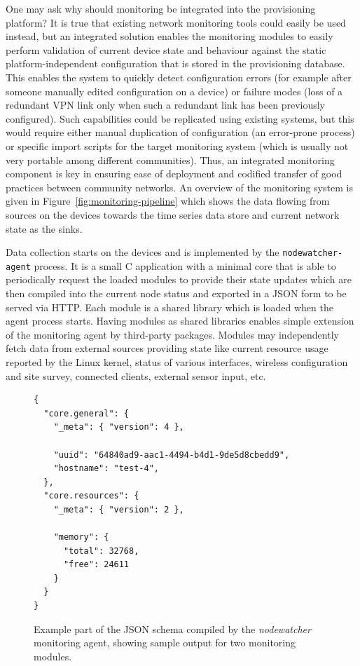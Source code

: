 \documentclass[5p,sort&compress]{elsarticle}
\newcommand{\nodewatcher}{\textit{nodewatcher}}
\begin{document}
One may ask why should monitoring be integrated into the provisioning platform?
It is true that existing network monitoring tools could easily be used instead, but an integrated solution enables the monitoring modules to easily perform validation of current device state and behaviour against the static platform-independent configuration that is stored in the provisioning database.
This enables the system to quickly detect configuration errors (for example after someone manually edited configuration on a device) or failure modes (loss of a redundant VPN link only when such a redundant link has been previously configured).
Such capabilities could be replicated using existing systems, but this would require either manual duplication of configuration (an error-prone process) or specific import scripts for the target monitoring system (which is usually not very portable among different communities).
Thus, an integrated monitoring component is key in ensuring ease of deployment and codified transfer of good practices between community networks.
An overview of the monitoring system is given in Figure~\ref{fig:monitoring-pipeline} which shows the data flowing from sources on the devices towards the time series data store and current network state as the sinks.

Data collection starts on the devices and is implemented by the \texttt{nodewatcher-agent} process.
It is a small C application with a minimal core that is able to periodically request the loaded modules to provide their state updates which are then compiled into the current node status and exported in a JSON form to be served via HTTP.
Each module is a shared library which is loaded when the agent process starts.
Having modules as shared libraries enables simple extension of the monitoring agent by third-party packages.
Modules may independently fetch data from external sources providing state like current resource usage reported by the Linux kernel, status of various interfaces, wireless configuration and site survey, connected clients, external sensor input, etc.

\begin{figure}[t]
\centering
\begin{verbatim}
{
  "core.general": {
    "_meta": { "version": 4 },
    
    "uuid": "64840ad9-aac1-4494-b4d1-9de5d8cbedd9",
    "hostname": "test-4",
  },
  "core.resources": {
    "_meta": { "version": 2 },
    
    "memory": {
      "total": 32768,
      "free": 24611
    }
  }
}
\end{verbatim}
\caption{Example part of the JSON schema compiled by the \nodewatcher{} monitoring agent, showing sample output for two monitoring modules.}
\label{fig:monitoring-json-schema}
\end{figure}
\end{document}

